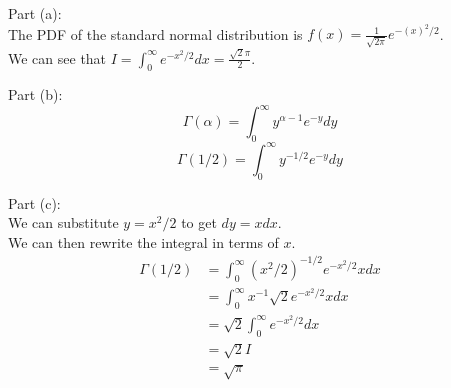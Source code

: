 \documentclass[answers,12pt,addpoints]{exam}
\begin{document}
\begin{questions}
    \begin{solution}
        Part (a):\\
        The PDF of the standard normal distribution is $f(x) = \frac{1}{\sqrt{2\pi}}e^{-(x)^2/2}$.\\
        We can see that $I = \int_{0}^{\infty}e^{-x^2 / 2}dx = \frac{\sqrt{2}\pi}{2}$.\\
    \end{solution}
    \begin{solution}
        Part (b):\\
        $$\Gamma(\alpha) = \int_{0}^{\infty}y^{\alpha - 1}e^{-y}dy$$
        $$ \Gamma(1/2) = \int_{0}^{\infty}y^{-1/2}e^{-y}dy$$
    \end{solution}
    \begin{solution}
        Part (c):\\
        We can substitute $y = x^2 / 2$ to get $dy = xdx$.\\
        We can then rewrite the integral in terms of $x$.
        \begin{align*}
            \Gamma(1/2) &= \int_{0}^{\infty}(x^2 / 2)^{-1/2}e^{-x^2 / 2} x dx\\
            &= \int_{0}^{\infty}x^{-1}\sqrt{2} e^{-x^2 / 2}x dx\\
            &= \sqrt{2}\int_{0}^{\infty}e^{-x^2 / 2}dx\\
            &= \sqrt{2}I \\
            &= \sqrt{\pi}
        \end{align*}


\end{solution}
\end{questions}
\end{document}
